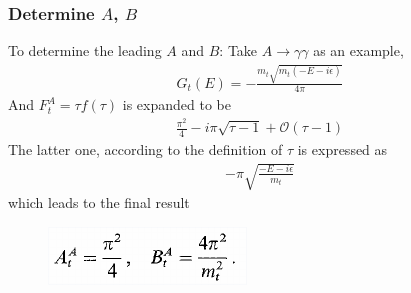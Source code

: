 \documentclass[8pt,dvipsnames,table]{beamer}
\begin{document}
\begin{frame}
	\frametitle{Determine $A$, $B$}

	To determine the leading $A$ and $B$: Take $A\to\gamma\gamma$ as an example,
	\begin{align}
		G_t(E)=-\frac{m_t\sqrt{m_t(-E-i\epsilon)}}{4\pi}
	\end{align}
	And $F_t^A=\tau f(\tau)$ is expanded to be
	\begin{align}
		\frac{\pi ^2}{4}-i \pi  \sqrt{\tau -1}+\mathcal{O}(\tau-1)
	\end{align}
	The latter one, according to the definition of $\tau$ is expressed as
	\begin{align}
		- \pi  \sqrt{\frac{-E-i\epsilon}{m_t}}
	\end{align}
	which leads to the final result
	\begin{figure}[!htb]
		\centering
		\includegraphics[width=.4\linewidth]{image17.png}
		\label{fig:image17}
	\end{figure}


\end{frame}
\end{document}
